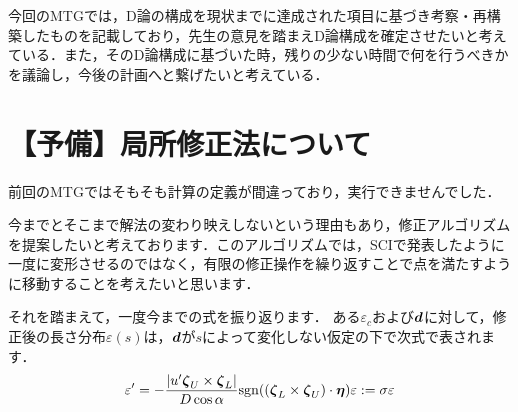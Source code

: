 \documentclass[16pt]{jsarticle}
\begin{document}
		
	\articleSPRobj
		今回のMTGでは，D論の構成を現状までに達成された項目に基づき考察・再構築したものを記載しており，先生の意見を踏まえD論構成を確定させたいと考えている．また，そのD論構成に基づいた時，残りの少ない時間で何を行うべきかを議論し，今後の計画へと繋げたいと考えている．
		

	\articleSPRitemsone
		
		\tableofcontents
		
		
	\articleSPRitemstwo
	\renewcommand{\labelitemi}{$\blacktriangledown$}
	\newcommand{\argmax}{\mathop{\rm arg~max}\limits}
	\newcommand{\argmin}{\mathop{\rm arg~min}\limits}
	\newcommand{\Ker}{{\rm Ker}}
	\newcommand{\rank}{{\rm rank}}
	\section{【予備】局所修正法について}
		前回のMTGではそもそも計算の定義が間違っており，実行できませんでした．
		
		今までとそこまで解法の変わり映えしないという理由もあり，修正アルゴリズムを提案したいと考えております．このアルゴリズムでは，SCIで発表したように一度に変形させるのではなく，有限の修正操作を繰り返すことで点を満たすように移動することを考えたいと思います．
		
		それを踏まえて，一度今までの式を振り返ります．
		ある$ \varepsilon_c $および$ \boldsymbol{d} $に対して，修正後の長さ分布$ \varepsilon(s) $は，$ \boldsymbol{d} $が$ s $によって変化しない仮定の下で次式で表されます．
		\begin{equation}\label{eq:varDiffeq}
			\varepsilon' = -\frac{|u'\boldsymbol{\zeta}_U\times \boldsymbol{\zeta}_L|}{D \cos \alpha} \mathrm{sgn}((\boldsymbol{\zeta}_L \times \boldsymbol{\zeta}_U) \cdot \boldsymbol{\eta})\varepsilon := \sigma \varepsilon
		\end{equation}
		
\end{document}
